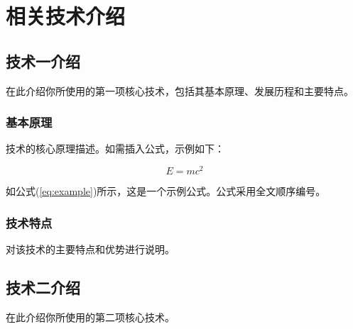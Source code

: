 \chapter{相关技术介绍}


\section{技术一介绍}

在此介绍你所使用的第一项核心技术，包括其基本原理、发展历程和主要特点。

\subsection{基本原理}

技术的核心原理描述。如需插入公式，示例如下：

\begin{equation}
    E = mc^2
    \label{eq:example}
\end{equation}

如公式(\ref{eq:example})所示，这是一个示例公式。公式采用全文顺序编号。

\subsection{技术特点}

对该技术的主要特点和优势进行说明。

\section{技术二介绍}

在此介绍你所使用的第二项核心技术。

%
%

